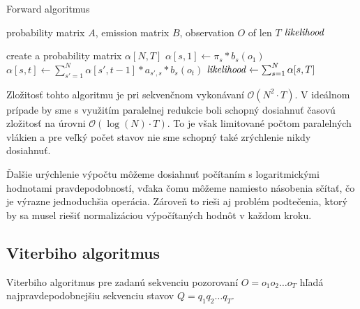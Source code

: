 \documentclass[11pt,a4paper]{article}
\begin{document}
\begin{algorithm}[!h]
  \caption{Forward algoritmus \cite{jurafsky_martin}} \label{alg-forward}
  \begin{algorithmic}[1]
    \renewcommand{\algorithmicrequire}{\textbf{Vstupy:}}
    \renewcommand{\algorithmicensure}{\textbf{Výstup:}}

    \Require probability matrix $A$, emission matrix $B$, observation $O$ of len $T$
    \Ensure $\mathit{likelihood}$

    \State create a probability matrix $\alpha[N, T]$
     
      \State $\alpha[s,1] \gets \pi_{s} * b_s(o_1)$
    \EndFor
    \Statex
     
        \State $\alpha[s,t] \gets \sum_{s' = 1}^{N} \alpha[s', t - 1] * a_{s', s} * b_s(o_t)$
      \EndFor
    \EndFor
    \Statex
    \State $\mathit{likelihood} \gets \sum_{s = 1}^{N} \alpha[s,T]$ 
  \end{algorithmic}
\end{algorithm}

Zložitosť tohto algoritmu je pri sekvenčnom vykonávaní $\mathcal{O}(N^2 \cdot T)$. V ideálnom prípade by sme s využitím paralelnej redukcie boli schopný dosiahnuť časovú zložitosť na úrovni  $\mathcal{O}(\log(N) \cdot T)$. To je však limitované počtom paralelných vlákien a pre veľký počet stavov nie sme schopný také zrýchlenie nikdy dosiahnuť. \cite{cuda-reductions}

Ďalšie urýchlenie výpočtu môžeme dosiahnuť počítaním s logaritmickými hodnotami pravdepodobností, vďaka čomu môžeme namiesto násobenia sčítať, čo je výrazne jednoduchšia operácia. Zároveň to rieši aj problém podtečenia, ktorý by sa musel riešiť normalizáciou výpočítaných hodnôt v každom kroku.

\newpage

\subsection{Viterbiho algoritmus}

Viterbiho algoritmus pre zadanú sekvenciu pozorovaní $O = o_1 o_2 \dots o_T$ hľadá najpravdepodobnejšiu sekvenciu stavov $Q = q_1 q_2\dots q_T$.
\end{document}
